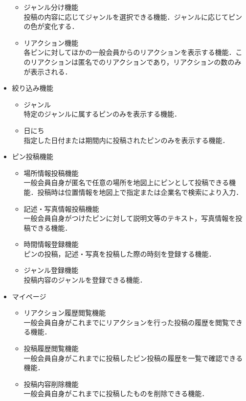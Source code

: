 \begin{itemize}[itemsep=10pt]
\begin{itemize}[itemsep=10pt]
        \item ジャンル分け機能 \mbox{}\\
        投稿の内容に応じてジャンルを選択できる機能．ジャンルに応じてピンの色が変化する．
        \item  リアクション機能 \mbox{}\\
        各ピンに対してほかの一般会員からのリアクションを表示する機能．このリアクションは匿名でのリアクションであり，リアクションの数のみが表示される．
    \end{itemize}
    \item 絞り込み機能
    \begin{itemize}[itemsep=10pt]
        \item ジャンル \mbox{}\\
        特定のジャンルに属するピンのみを表示する機能．
        \item 日にち \mbox{}\\
        指定した日付または期間内に投稿されたピンのみを表示する機能．
    \end{itemize}
    \item ピン投稿機能
    \begin{itemize}[itemsep=10pt]
        \item 場所情報投稿機能 \mbox{}\\
        一般会員自身が匿名で任意の場所を地図上にピンとして投稿できる機能．投稿時は位置情報を地図上で指定または企業名で検索により入力．
        \item 記述・写真情報投稿機能 \mbox{}\\
        一般会員自身がつけたピンに対して説明文等のテキスト，写真情報を投稿できる機能．
        \item 時間情報登録機能 \mbox{}\\
        ピンの投稿，記述・写真を投稿した際の時刻を登録する機能．
        \item ジャンル登録機能 \mbox{}\\
        投稿内容のジャンルを登録できる機能．
    \end{itemize}
    \item マイページ
    \begin{itemize}[itemsep=10pt]
        \item リアクション履歴閲覧機能 \mbox{}\\
        一般会員自身がこれまでにリアクションを行った投稿の履歴を閲覧できる機能．
        \item 投稿履歴閲覧機能 \mbox{}\\
        一般会員自身がこれまでに投稿したピン投稿の履歴を一覧で確認できる機能．
        \item 投稿内容削除機能 \mbox{}\\
        一般会員自身がこれまでに投稿したものを削除できる機能．
    \end{itemize}
\end{itemize}

